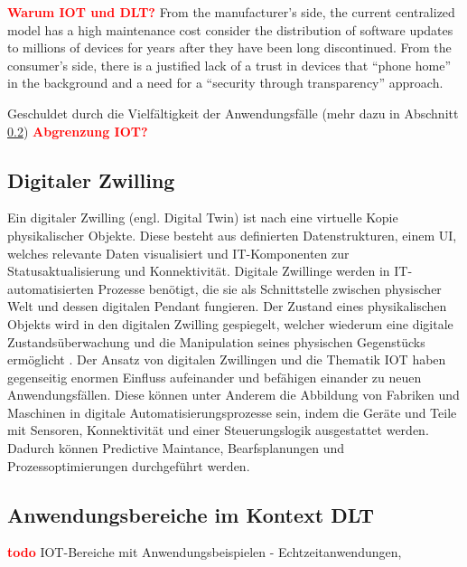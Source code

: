 \textbf{\textcolor{red}{Warum IOT und DLT?}}
\cite{SCIOT2016}
From the manufacturer's side, the current centralized model has a high maintenance cost consider the distribution of software updates to millions of devices for years after they have been long discontinued. From the consumer's side, there is a justified lack of a trust in devices that ``phone home'' in the background and a need for a ``security through transparency'' approach.

Geschuldet durch die Vielfältigkeit der Anwendungsfälle (mehr dazu in Abschnitt \ref{subsec:fundamentals:iot:usecases})
\textbf{\textcolor{red}{Abgrenzung IOT?}}

\subsection{Digitaler Zwilling}
\label{subsec:fundamentals:iot:digitaltwins}
Ein digitaler Zwilling (engl. Digital Twin) ist nach \cite{deloitte2018} eine virtuelle Kopie physikalischer Objekte. Diese besteht aus definierten Datenstrukturen, einem \ac{UI}, welches relevante Daten visualisiert und IT-Komponenten zur Statusaktualisierung und Konnektivität. Digitale Zwillinge werden in IT-automatisierten Prozesse benötigt, die sie als Schnittstelle zwischen physischer Welt und dessen digitalen Pendant fungieren. Der Zustand eines physikalischen Objekts wird in den digitalen Zwilling gespiegelt, welcher wiederum eine digitale Zustandsüberwachung und die Manipulation seines physischen Gegenstücks ermöglicht \cite{deloitte2018}. Der Ansatz von digitalen Zwillingen und die Thematik \ac{IOT} haben gegenseitig enormen Einfluss aufeinander und befähigen einander zu neuen Anwendungsfällen. Diese können unter Anderem die Abbildung von Fabriken und Maschinen in digitale Automatisierungsprozesse sein, indem die Geräte und Teile mit Sensoren, Konnektivität und einer Steuerungslogik ausgestattet werden. Dadurch können Predictive Maintance, Bearfsplanungen und Prozessoptimierungen durchgeführt werden.


\subsection{Anwendungsbereiche im Kontext DLT}
\label{subsec:fundamentals:iot:usecases}
\textbf{\textcolor{red}{todo}}
IOT-Bereiche mit Anwendungsbeispielen - Echtzeitanwendungen,
